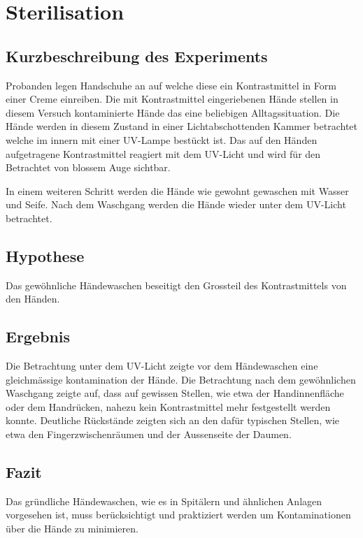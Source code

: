 \section{Sterilisation}

\subsection{Kurzbeschreibung des Experiments}
Probanden legen Handschuhe an auf welche diese ein Kontrastmittel in Form
einer Creme einreiben. Die mit Kontrastmittel eingeriebenen Hände stellen
in diesem Versuch kontaminierte Hände das eine beliebigen Alltagssituation.
Die Hände werden in diesem Zustand in einer Lichtabschottenden Kammer
betrachtet welche im innern mit einer UV-Lampe bestückt ist. Das auf den
Händen aufgetragene Kontrastmittel reagiert mit dem UV-Licht und wird für
den Betrachtet von blossem Auge sichtbar.

In einem weiteren Schritt werden die Hände wie gewohnt gewaschen mit Wasser
und Seife. Nach dem Waschgang werden die Hände wieder unter dem UV-Licht
betrachtet.

\subsection{Hypothese}
Das gewöhnliche Händewaschen beseitigt den Grossteil des Kontrastmittels
von den Händen.

\subsection{Ergebnis}
Die Betrachtung unter dem UV-Licht zeigte vor dem Händewaschen eine
gleichmässige kontamination der Hände. Die Betrachtung nach dem 
gewöhnlichen Waschgang zeigte auf, dass auf gewissen Stellen, wie etwa
der Handinnenfläche oder dem Handrücken, nahezu kein Kontrastmittel mehr
festgestellt werden konnte. Deutliche Rückstände zeigten sich an den
dafür typischen Stellen, wie etwa den Fingerzwischenräumen und der
Aussenseite der Daumen.

\subsection{Fazit}
Das gründliche Händewaschen, wie es in Spitälern und ähnlichen Anlagen
vorgesehen ist, muss berücksichtigt und praktiziert werden um 
Kontaminationen über die Hände zu minimieren.
